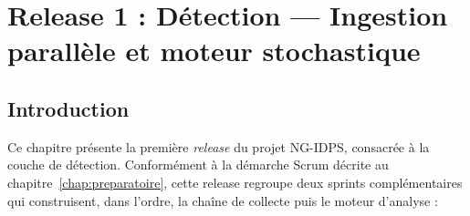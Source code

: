 
\providecommand{\A}[1]{\textcolor{red}{\textbf{[À COMPLÉTER : #1]}}}
\providecommand{\VERIF}[1]{\textcolor{orange}{\textbf{[À VÉRIFIER : #1]}}}
\providecommand{\FIG}[4]{%
  \begin{figure}[H]
    \centering
    \fbox{\parbox[c][5.5cm][c]{0.9\textwidth}{\centering
      \textcolor{gray}{\textbf{[EMPLACEMENT — #3]}}\\[4pt]
      \textcolor{gray}{\small #4}}}
    \caption{#2}
    \label{#1}
  \end{figure}}


\chapter{Release 1 : Détection --- Ingestion parallèle et moteur stochastique}
\label{chap:release1}

\section*{Introduction}

Ce chapitre présente la première \emph{release} du projet NG-IDPS, consacrée à la couche de détection. Conformément à la démarche Scrum décrite au chapitre~\ref{chap:preparatoire}, cette release regroupe deux sprints complémentaires qui construisent, dans l'ordre, la chaîne de collecte puis le moteur d'analyse :

